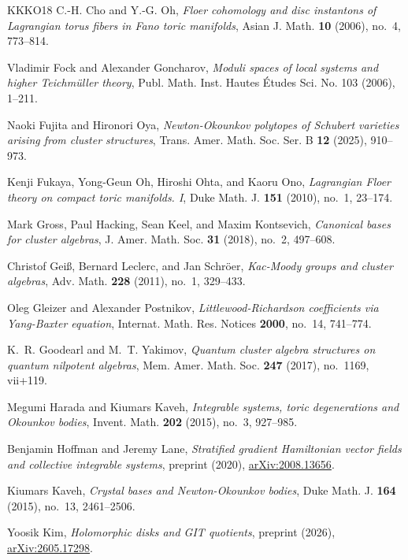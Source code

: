 \documentclass[11pt]{amsart}
\theoremstyle{plain}
\theoremstyle{definition}
\theoremstyle{remark}
\numberwithin{equation}{section} \numberwithin{table}{section}
\numberwithin{equation}{section}
\begin{document}
\begin{thebibliography}{KKKO18}
C.-H. Cho and Y.-G. Oh, \emph{Floer cohomology and disc instantons of Lagrangian torus fibers in Fano toric manifolds}, Asian J. Math. {\bf 10} (2006), no.~4, 773--814.

Vladimir Fock and Alexander Goncharov, \emph{Moduli spaces of local systems and higher Teichm\"uller theory}, Publ. Math. Inst. Hautes \'Etudes Sci. No. 103 (2006), 1--211.

Naoki Fujita and Hironori Oya,  \emph{Newton-{O}kounkov polytopes of {S}chubert varieties arising from
  cluster structures}, Trans. Amer. Math. Soc. Ser. B \textbf{12} (2025), 910--973.
  
Kenji Fukaya, Yong-Geun Oh, Hiroshi Ohta, and Kaoru Ono,  \emph{Lagrangian {F}loer theory on compact toric manifolds. {I}}, Duke Math. J. \textbf{151} (2010), no.~1, 23--174. 

Mark Gross, Paul Hacking, Sean Keel, and Maxim Kontsevich, \emph{Canonical
  bases for cluster algebras}, J. Amer. Math. Soc. \textbf{31} (2018), no.~2,
  497--608. 
  
Christof Gei\ss, Bernard Leclerc, and Jan Schr\"{o}er, \emph{Kac-{M}oody groups and cluster algebras}, Adv. Math. \textbf{228} (2011), no.~1, 329--433.

Oleg Gleizer and Alexander Postnikov, \emph{Littlewood-Richardson coefficients via Yang-Baxter equation}, Internat. Math. Res. Notices {\bf 2000}, no.~14, 741--774.

K.~R. Goodearl and M.~T. Yakimov, \emph{Quantum cluster algebra structures on
  quantum nilpotent algebras}, Mem. Amer. Math. Soc. \textbf{247} (2017),
  no.~1169, vii+119. 

Megumi Harada and Kiumars Kaveh, \emph{Integrable systems, toric degenerations
  and {O}kounkov bodies}, Invent. Math. \textbf{202} (2015), no.~3, 927--985.
  
Benjamin Hoffman and Jeremy Lane, \emph{Stratified gradient Hamiltonian vector fields and collective integrable systems}, preprint (2020), \href{https://arxiv.org/abs/2008.13656}{arXiv:2008.13656}.

Kiumars Kaveh, \emph{Crystal bases and {N}ewton-{O}kounkov bodies}, Duke Math.
  J. \textbf{164} (2015), no.~13, 2461--2506. 

Yoosik Kim, \emph{Holomorphic disks and GIT quotients}, preprint (2026), \href{https://arxiv.org/abs/2605.17298}{arXiv:2605.17298}.


\end{thebibliography}
\end{document}
